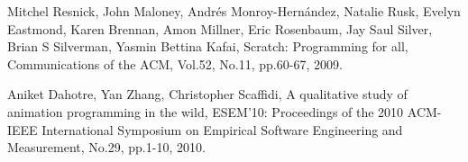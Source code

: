 \documentclass[twocolumn]{jarticle} %
\begin{document}



\begin{thebibliography}{9}	%
				
Mitchel Resnick, John Maloney, Andr\'{e}s Monroy-Hern\'{a}ndez, Natalie Rusk, Evelyn Eastmond, Karen Brennan, 
Amon Millner, Eric Rosenbaum, Jay Saul Silver, Brian S Silverman, Yasmin Bettina Kafai,
Scratch: Programming for all,
Communications of the ACM, Vol.52, No.11, pp.60-67, 2009.

Aniket Dahotre, Yan Zhang, Christopher Scaffidi,
A qualitative study of animation programming in the wild,
ESEM'10: Proceedings of the 2010 ACM-IEEE International Symposium on Empirical Software Engineering and Measurement,
No.29, pp.1-10, 2010.

\end{thebibliography}

\end{document}
